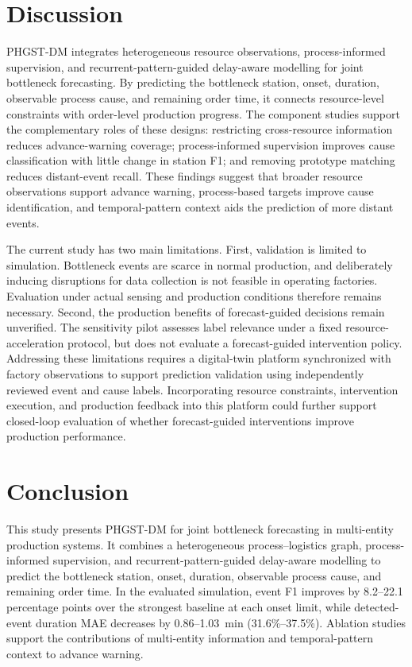 \documentclass[a4paper,fleqn]{cas-dc}
\begin{document}
\section{Discussion}\label{sec:discussion}

PHGST-DM integrates heterogeneous resource observations, process-informed supervision, and recurrent-pattern-guided delay-aware modelling for joint bottleneck forecasting. By predicting the bottleneck station, onset, duration, observable process cause, and remaining order time, it connects resource-level constraints with order-level production progress. The component studies support the complementary roles of these designs: restricting cross-resource information reduces advance-warning coverage; process-informed supervision improves cause classification with little change in station F1; and removing prototype matching reduces distant-event recall. These findings suggest that broader resource observations support advance warning, process-based targets improve cause identification, and temporal-pattern context aids the prediction of more distant events.

The current study has two main limitations. First, validation is limited to simulation. Bottleneck events are scarce in normal production, and deliberately inducing disruptions for data collection is not feasible in operating factories. Evaluation under actual sensing and production conditions therefore remains necessary. Second, the production benefits of forecast-guided decisions remain unverified. The sensitivity pilot assesses label relevance under a fixed resource-acceleration protocol, but does not evaluate a forecast-guided intervention policy. Addressing these limitations requires a digital-twin platform synchronized with factory observations to support prediction validation using independently reviewed event and cause labels. Incorporating resource constraints, intervention execution, and production feedback into this platform could further support closed-loop evaluation of whether forecast-guided interventions improve production performance.


\section{Conclusion}\label{sec:conclusion}

This study presents PHGST-DM for joint bottleneck forecasting in multi-entity production systems. It combines a heterogeneous process--logistics graph, process-informed supervision, and recurrent-pattern-guided delay-aware modelling to predict the bottleneck station, onset, duration, observable process cause, and remaining order time. In the evaluated simulation, event F1 improves by 8.2--22.1 percentage points over the strongest baseline at each onset limit, while detected-event duration MAE decreases by 0.86--1.03~min (31.6\%--37.5\%). Ablation studies support the contributions of multi-entity information and temporal-pattern context to advance warning.
\end{document}
